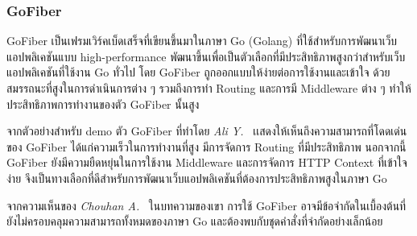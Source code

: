 \documentclass[12pt,oneside,openright,a4paper]{cpe-thai-project}
\begin{document}
        \subsubsection{GoFiber}
            \begin{flushleft}
                GoFiber เป็นเฟรมเวิร์คเบ็ดเสร็จที่เขียนขึ้นมาในภาษา Go (Golang) ที่ใช้สำหรับการพัฒนาเว็บแอปพลิเคชันแบบ high-performance พัฒนาขึ้นเพื่อเป็นตัวเลือกที่มีประสิทธิภาพสูงกว่าสำหรับเว็บแอปพลิเคชันที่ใช้งาน Go ทั่วไป โดย GoFiber ถูกออกแบบให้ง่ายต่อการใช้งานและเข้าใจ ด้วยสมรรถนะที่สูงในการดำเนินการต่าง ๆ รวมถึงการทำ Routing และการมี Middleware ต่าง ๆ ทำให้ประสิทธิภาพการทำงานของตัว GoFiber นั้นสูง~\cite{gofiber}
            \end{flushleft}
            \begin{flushleft}
                จากตัวอย่างสำหรับ demo ตัว GoFiber ที่ทำโดย \textit{Ali Y.}~\cite{ali20fiber} เเสดงให้เห็นถึงความสามารถที่โดดเด่นของ GoFiber ได้แก่ความเร็วในการทำงานที่สูง มีการจัดการ Routing ที่มีประสิทธิภาพ นอกจากนี้ GoFiber ยังมีความยืดหยุ่นในการใช้งาน Middleware และการจัดการ HTTP Context ที่เข้าใจง่าย จึงเป็นทางเลือกที่ดีสำหรับการพัฒนาเว็บแอปพลิเคชันที่ต้องการประสิทธิภาพสูงในภาษา Go
            \end{flushleft}
            \begin{flushleft}
                จากความเห็นของ \textit{Chouhan A.}~\cite{chouhan21fiber} ในบทความของเขา การใช้ GoFiber อาจมีข้อจำกัดในเบื้องต้นที่ยังไม่ครอบคลุมความสามารถทั้งหมดของภาษา Go และต้องพบกับชุดคำสั่งที่จำกัดอย่างเล็กน้อย
            \end{flushleft}
\end{document}
